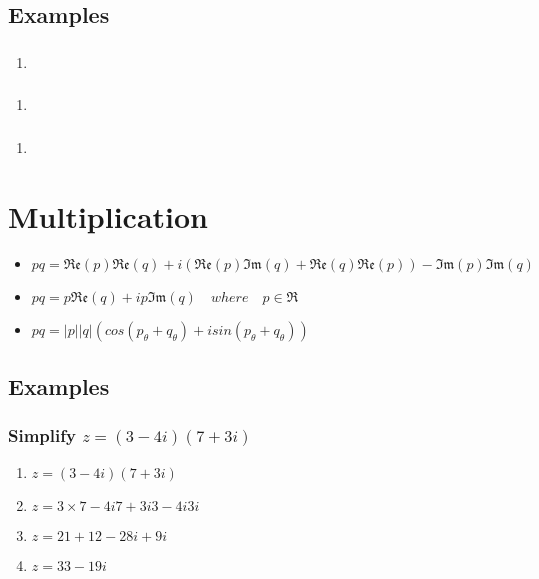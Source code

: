 \documentclass{report}
\newcommand{\re}[1]{\mathfrak{Re}(#1)}
\newcommand{\im}[1]{\mathfrak{Im}(#1)}
\newcommand{\abs}[1]{\mathopen|#1\mathclose|}
\newcommand{\realnumbers}{\mathfrak{R}}
\newcommand{\where}{\quad where \quad}
\renewcommand{\sin}[1]{sin(#1)}
\renewcommand{\cos}[1]{cos(#1)}
\begin{document}
            \subsection{Examples}
                \subsubsection{}
                    \begin{enumerate}
                        \item 
                    \end{enumerate}
                \subsubsection{}
                    \begin{enumerate}
                        \item 
                    \end{enumerate}
                \subsubsection{}
                    \begin{enumerate}
                        \item 
                    \end{enumerate}
        \section{Multiplication}
            \begin{itemize}
                \item $pq=\re{p}\re{q}+i(\re{p}\im{q}+\re{q}\re{p})-\im{p}\im{q}$
                \item $pq=p\re{q}+ip\im{q}\where p\in\realnumbers$
                \item $pq=\abs{p}\abs{q}(\cos{p_\theta+q_\theta}+i\sin{p_\theta+q_\theta})$
            \end{itemize}
            \subsection{Examples}
                \subsubsection{Simplify $z=(3-4i)(7+3i)$}
                    \begin{enumerate}
                        \item $z=(3-4i)(7+3i)$
                        \item $z=3\times7-4i7+3i3-4i3i$
                        \item $z=21+12-28i+9i$
                        \item $z=33-19i$
                    \end{enumerate}
\end{document}
